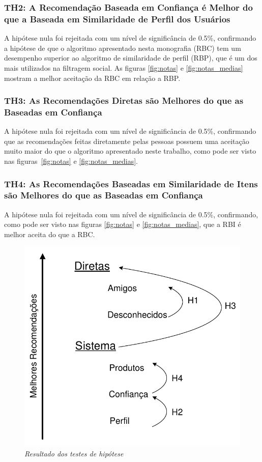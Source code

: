\subsubsection{TH2: A Recomendação Baseada em Confiança é Melhor do que a Baseada em Similaridade de Perfil dos Usuários}
A hipótese nula foi rejeitada com um nível de significância de 0.5\%, confirmando a hipótese de que o algoritmo apresentado nesta monografia (RBC) tem um desempenho superior ao algoritmo de similaridade de perfil (RBP), que é um dos mais utilizados na filtragem social. As figuras \ref{fig:notas} e \ref{fig:notas_medias} mostram a melhor aceitação da RBC em relação a RBP.

\subsubsection{TH3: As Recomendações Diretas são Melhores do que as Baseadas em Confiança}
A hipótese nula foi rejeitada com um nível de significância de 0.5\%, confirmando que as recomendações feitas diretamente pelas pessoas possuem uma aceitação muito maior do que o algoritmo apresentado neste trabalho, como pode ser visto nas figuras~\ref{fig:notas} e \ref{fig:notas_medias}.

\subsubsection{TH4: As Recomendações Baseadas em Similaridade de Itens são Melhores do que as Baseadas em Confiança}
A hipótese nula foi rejeitada com um nível de significância de 0.5\%, confirmando, como pode ser visto nas figuras \ref{fig:notas} e \ref{fig:notas_medias}, que a RBI é melhor aceita do que a RBC.

\begin{figure}
    \centering
    \includegraphics[width=\textwidth]{imagens/testes}
    \caption{\it Resultado dos testes de hipótese}
    \label{fig:testes}
\end{figure}


